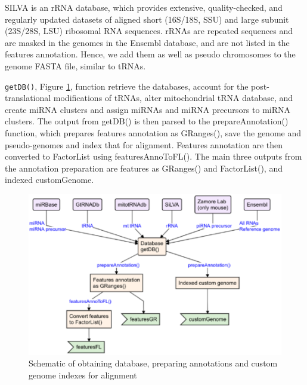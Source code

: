 \documentclass[12pt,twoside]{reedthesis}
\begin{document}
SILVA is an rRNA database, which provides extensive, quality-checked,
and regularly updated datasets of aligned short (16S/18S, SSU) and large
subunit (23S/28S, LSU) ribosomal RNA sequences. rRNAs are repeated
sequences and are masked in the genomes in the Ensembl database, and are
not listed in the features annotation. Hence, we add them as well as
pseudo chromosomes to the genome FASTA file, similar to tRNAs.

\texttt{getDB()}, Figure \ref{fig:3f6}, function retrieve the databases, account for the
post-translational modifications of tRNAs, alter mitochondrial tRNA
database, and create miRNA clusters and assign miRNAs and miRNA
precursors to miRNA clusters. The output from getDB() is then parsed to
the prepareAnnotation() function, which prepares features annotation as
GRanges(), save the genome and pseudo-genomes and index that for
alignment. Features annotation are then converted to FactorList using
featuresAnnoToFL(). The main three outputs from the annotation
preparation are features as GRanges() and FactorList(), and indexed
customGenome.


\begin{figure}[H]

{\centering \includegraphics{thesis_files/figure-latex/3f6-1} 

}

\caption{Schematic of obtaining database, preparing annotations and custom genome indexes for alignment}\label{fig:3f6}
\end{figure}
\end{document}
